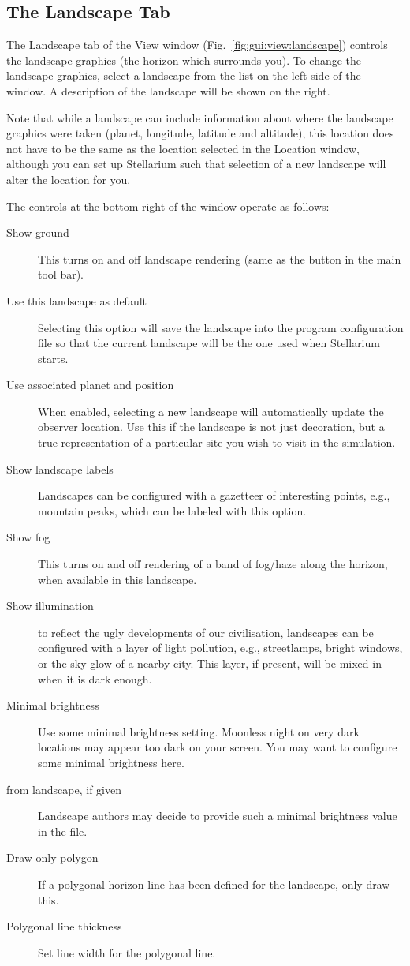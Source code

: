 \subsection{The Landscape Tab}
\label{sec:gui:view:landscape}

The Landscape tab of the View window
(Fig.~\ref{fig:gui:view:landscape}) controls the landscape graphics
(the horizon which surrounds you). To change the landscape graphics,
select a landscape from the list on the left side of the window. A
description of the landscape will be shown on the right.

Note that while a landscape  can include information about where the
landscape graphics were taken (planet, longitude, latitude and
altitude), this location does not have to be the same as the location
selected in the Location window, although you can set up Stellarium such
that selection of a new landscape will alter the location for you.

The controls at the bottom right of the window operate as follows:

\begin{description}
\item[Show ground] This turns on and off landscape rendering (same
  as the button  in the main tool bar).
\item[Use this landscape as default] Selecting this option will save
  the landscape into the program configuration file so that the current
  landscape will be the one used when Stellarium starts.
\item[Use associated planet and position] When enabled, selecting a
  new landscape will automatically update the observer location.
  Use this if the landscape is not just decoration, but a true
  representation of a particular site you wish to visit in the simulation.
\item[Show landscape labels] Landscapes can be configured with a
  gazetteer of interesting points, e.g., mountain peaks, which can be
  labeled with this option.
\item[Show fog] This turns on and off rendering of a band of
  fog/haze along the horizon, when available in this landscape.
\item[Show illumination] to reflect the ugly developments of our
  civilisation, landscapes can be configured with a layer of light
  pollution, e.g., streetlamps, bright windows, or the sky glow of a
  nearby city. This layer, if present, will be mixed in when it is
  dark enough.
\item[Minimal brightness] Use some minimal brightness
  setting. Moonless night on very dark locations may appear too dark
  on your screen. You may want to configure some minimal brightness
  here.
\item[from landscape, if given] Landscape authors may decide to
  provide such a minimal brightness value in the 
  file. 
\item[Draw only polygon] If a polygonal horizon line has been
  defined for the landscape, only draw this. 
\item[Polygonal line thickness] Set line width for the polygonal line.
\end{description}

